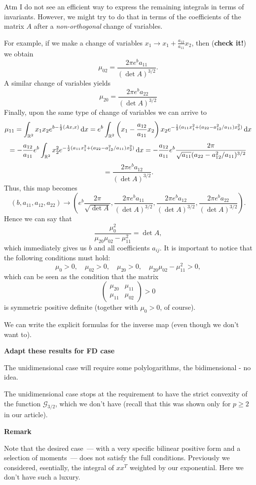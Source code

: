 \documentclass{article}
\begin{document}
Atm I do not see an efficient way to express the remaining integrals in terms of invariants. However, we might try to do that in terms of the coefficients of the matrix $A$ after a \textit{non-orthogonal} change of variables.

For example, if we make a change of variables $x_1\to x_1+ \frac{a_{12}}{a_{11}}x_2$, then (\textbf{check it!}) we obtain
\[
	\mu_{02} = \frac{2\pi e^b a_{11}}{(\det A)^{3/2}}.
\]
A similar change of variables yields
\[
	\mu_{20} = \frac{2\pi e^b a_{22}}{(\det A)^{3/2}}
\]
Finally, upon the same type of change of variables we can arrive to
\[
	\mu_{11}=\int_{{\mathbb R^2}}^{}x_1x_2e^{b-\frac{1}{2}(Ax,x)}{\,\mathrm{d} x}=e^b\int_{{\mathbb R^2}}^{}\left(x_1- \frac{a_{12}}{a_{11}}x_2\right)x_2 e^{-\frac{1}{2}(a_{11}x_1^2+(a_{22}-a_{12}^2/a_{11})x_2^2)}{\,\mathrm{d} x}
\]
\[
	=-\frac{a_{12}}{a_{11}}e^b\int_{\mtt}^{} x_2^2 e^{-\frac{1}{2}(a_{11}x_1^2+(a_{22}-a_{12}^2/a_{11})x_2^2)}\dx=-\frac{a_{12}}{a_{11}}e^b\frac{2\pi}{\sqrt{a_{11}}(a_{22}-a_{12}^2/a_{11})^{3/2}}
%
\]
\[
	=\frac{2\pi e^b a_{12}}{(\det A)^{3/2}}.
\]
Thus, this map becomes
\[
	(b,a_{11},a_{12},a_{22})\to\left( e^{b}\frac{2\pi}{\sqrt{\det A}}, \frac{2\pi e^b a_{11}}{(\det A)^{3/2}}, \frac{2\pi e^b a_{12}}{(\det A)^{3/2}},\frac{2\pi e^b a_{22}}{(\det A)^{3/2}} \right).
\]
Hence we can say that
\[
	\frac{\mu_0^2}{\mu_{20}\mu_{02}-\mu_{11}^2} = \det A,
\]
which immediately gives us $b$ and all coefficients $a_{ij}$. It is important to notice that the following conditions must hold:
\[
	\mu_0>0,\quad \mu_{02}>0,\quad \mu_{20}>0,\quad \mu_{20}\mu_{02}-\mu_{11}^2>0,
\]
which can be seen as the condition that the matrix \[
	\begin{pmatrix}
		\mu_{20}&\mu_{11}\\
		\mu_{11}&\mu_{02}
	\end{pmatrix}>0
\]
is symmetric positive definite (together with $\mu_0>0$, of course).

We can write the explicit formulas for the inverse map (even though we don't want to).


\textbf{Adapt these results for FD case}

The unidimensional case will require some polylogarithms, the bidimensional - no idea.

The unidimensional case stops at the requirement to have the strict convexity of the function $\mathcal G_{3/2}$, which we don't have (recall that this was shown only for $p\ge 2$ in our article).

\textbf{Remark}

Note that the desired case~--- with a very specific bilinear positive form and a selection of moments~--- does not satisfy the full conditions. Previously we considered, esentially, the integral of $xx^T$ weighted by our exponential. Here we don't have such a luxury.
\end{document}
